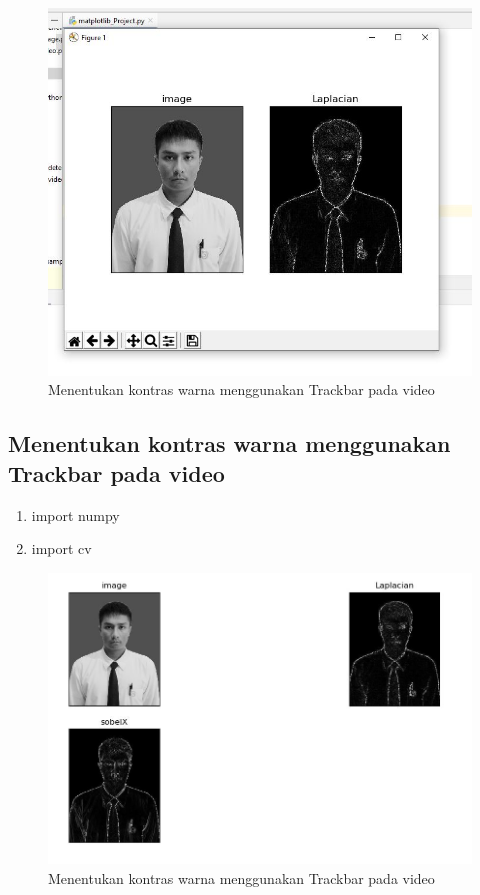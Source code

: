 \newpage
\begin{figure}[ht]
\centering
\includegraphics[scale=0.5]{figures/2,65.jpg}
\caption{Menentukan kontras warna menggunakan Trackbar pada video}
\label{contoh}
\end{figure}








\newpage
\subsection{Menentukan kontras warna menggunakan Trackbar pada video}

\begin{enumerate}
	\item import numpy
	\item import cv
\end{enumerate}

\newpage
\begin{figure}[ht]
\centering
\includegraphics[scale=0.5]{figures/2,66.jpg}
\caption{Menentukan kontras warna menggunakan Trackbar pada video}
\label{contoh}
\end{figure}







